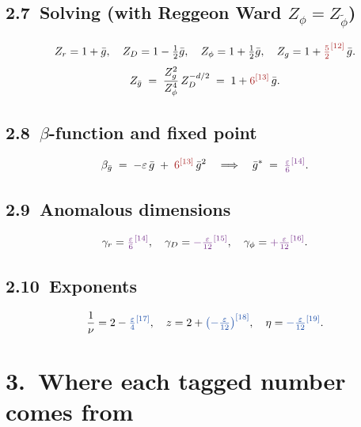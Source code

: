 \documentclass[11pt,a4paper]{article}
\newcommand{\cv}[2]{{\color{cntcol}{#2}^{[#1]}}}   %
\newcommand{\pv}[2]{{\color{phycol}{#2}^{[#1]}}}   %
\newcommand{\mv}[2]{{\color{mixcol}{#2}^{[#1]}}}   %
\begin{document}
\subsection*{2.7\ Solving (with Reggeon Ward $Z_{\phi}=Z_{\widetilde\phi}$)}
\[
Z_{r} = 1 + \bar g,\quad Z_{D} = 1 - \tfrac{1}{2}\bar g,\quad Z_{\phi} = 1 + \tfrac{1}{2}\bar g,\quad
Z_{g} = 1 + \cv{12}{\tfrac{5}{2}}\,\bar g.
\]
\[
Z_{\bar g} \;=\; \frac{Z_{g}^{2}}{Z_{\phi}^{4}}\,Z_{D}^{-d/2} \;=\; 1 + \cv{13}{6}\,\bar g.
\]

\subsection*{2.8\ $\beta$-function and fixed point}
\[
\beta_{\bar g} \;=\; -\varepsilon\,\bar g \;+\; \cv{13}{6}\,\bar g^{2}
\quad\Longrightarrow\quad
\bar g^{*} \;=\; \mv{14}{\tfrac{\varepsilon}{6}}.
\]

\subsection*{2.9\ Anomalous dimensions}
\[
\gamma_{r} = \mv{14}{\tfrac{\varepsilon}{6}},\quad
\gamma_{D} = \mv{15}{-\tfrac{\varepsilon}{12}},\quad
\gamma_{\phi} = \mv{16}{+\tfrac{\varepsilon}{12}}.
\]

\subsection*{2.10\ Exponents}
\[
\frac{1}{\nu} = 2 - \pv{17}{\tfrac{\varepsilon}{4}},\quad
z = 2 + \pv{18}{\bigl(-\tfrac{\varepsilon}{12}\bigr)},\quad
\eta = \pv{19}{-\tfrac{\varepsilon}{12}}.
\]

\section*{3.\ Where each tagged number comes from}
\end{document}
